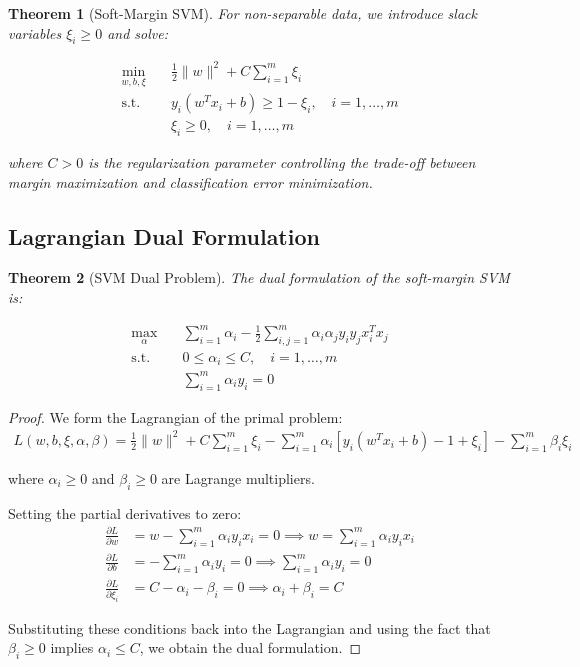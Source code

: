 \documentclass[12pt, a4paper]{article}
\newtheorem{theorem}{Theorem}
\begin{document}
\begin{theorem}[Soft-Margin SVM]
For non-separable data, we introduce slack variables $\xi_i \geq 0$ and solve:

\begin{align}
\min_{w,b,\xi} &\quad \frac{1}{2}\|w\|^2 + C\sum_{i=1}^m \xi_i \\
\text{s.t.} &\quad y_i(w^Tx_i + b) \geq 1 - \xi_i, \quad i = 1, \ldots, m \\
&\quad \xi_i \geq 0, \quad i = 1, \ldots, m
\end{align}

where $C > 0$ is the regularization parameter controlling the trade-off between margin maximization and classification error minimization.
\end{theorem}

\subsection{Lagrangian Dual Formulation}

\begin{theorem}[SVM Dual Problem]
The dual formulation of the soft-margin SVM is:

\begin{align}
\max_{\alpha} &\quad \sum_{i=1}^m \alpha_i - \frac{1}{2}\sum_{i,j=1}^m \alpha_i \alpha_j y_i y_j x_i^T x_j \\
\text{s.t.} &\quad 0 \leq \alpha_i \leq C, \quad i = 1, \ldots, m \\
&\quad \sum_{i=1}^m \alpha_i y_i = 0
\end{align}
\end{theorem}

\begin{proof}
We form the Lagrangian of the primal problem:
\begin{align}
L(w,b,\xi,\alpha,\beta) = \frac{1}{2}\|w\|^2 + C\sum_{i=1}^m \xi_i - \sum_{i=1}^m \alpha_i[y_i(w^Tx_i + b) - 1 + \xi_i] - \sum_{i=1}^m \beta_i \xi_i
\end{align}

where $\alpha_i \geq 0$ and $\beta_i \geq 0$ are Lagrange multipliers.

Setting the partial derivatives to zero:
\begin{align}
\frac{\partial L}{\partial w} &= w - \sum_{i=1}^m \alpha_i y_i x_i = 0 \implies w = \sum_{i=1}^m \alpha_i y_i x_i \\
\frac{\partial L}{\partial b} &= -\sum_{i=1}^m \alpha_i y_i = 0 \implies \sum_{i=1}^m \alpha_i y_i = 0 \\
\frac{\partial L}{\partial \xi_i} &= C - \alpha_i - \beta_i = 0 \implies \alpha_i + \beta_i = C
\end{align}

Substituting these conditions back into the Lagrangian and using the fact that $\beta_i \geq 0$ implies $\alpha_i \leq C$, we obtain the dual formulation.
\end{proof}
\end{document}

